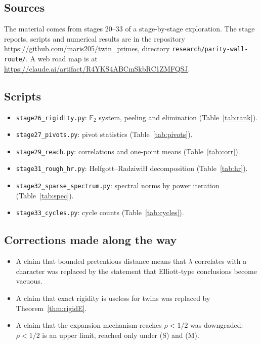 \documentclass[11pt]{amsart}
\theoremstyle{definition}
\theoremstyle{remark}
\begin{document}
\subsection{Sources}
The material comes from stages 20--33 of a stage-by-stage exploration. The stage reports, scripts and numerical results are in the repository \url{https://github.com/maris205/twin_primes}, directory \texttt{research/parity-wall-route/}. A web road map is at \url{https://claude.ai/artifact/R4YKS4ABCmSkbRC1ZMFQSJ}.

\subsection{Scripts}
\begin{itemize}
\item \texttt{stage26\_rigidity.py}: $\mathbb F_2$ system, peeling and elimination (Table~\ref{tab:rank}).
\item \texttt{stage27\_pivots.py}: pivot statistics (Table~\ref{tab:pivots}).
\item \texttt{stage29\_reach.py}: correlations and one-point means (Table~\ref{tab:corr}).
\item \texttt{stage31\_rough\_hr.py}: Helfgott--Radziwi\l{}\l{} decomposition (Table~\ref{tab:hr}).
\item \texttt{stage32\_sparse\_spectrum.py}: spectral norms by power iteration (Table~\ref{tab:spec}).
\item \texttt{stage33\_cycles.py}: cycle counts (Table~\ref{tab:cycles}).
\end{itemize}

\subsection{Corrections made along the way}
\begin{itemize}
\item A claim that bounded pretentious distance means that $\lambda$ correlates with a character was replaced by the statement that Elliott-type conclusions become vacuous.
\item A claim that exact rigidity is useless for twins was replaced by Theorem~\ref{thm:rigidE}.
\item A claim that the expansion mechanism reaches $\rho<1/2$ was downgraded: $\rho<1/2$ is an upper limit, reached only under (S) and (M).
\end{itemize}



\end{document}
